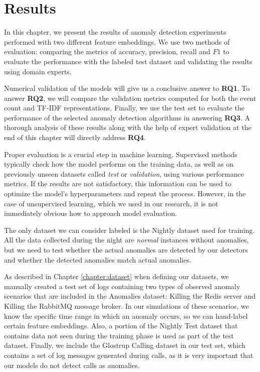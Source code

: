 \chapter{Results}
\label{results}

In this chapter, we present the results of anomaly detection experiments performed with two different feature embeddings. We use two methods of evaluation: comparing the metrics of accuracy, precision, recall and $F1$ to evaluate the performance with the labeled test dataset and validating the results using domain experts.

Numerical validation of the models will give us a conclusive answer to \textbf{RQ1}. To answer \textbf{RQ2}, we will compare the validation metrics computed for both the event count and TF-IDF representations. Finally, we use the test set to evaluate the performance of the selected anomaly detection algorithms in answering \textbf{RQ3}. A thorough analysis of these results along with the help of expert validation at the end of this chapter will directly address \textbf{RQ4}.

Proper evaluation is a crucial step in machine learning. Supervised methods typically check how the model performs on the training data, as well as on previously unseen datasets called \textit{test} or \textit{validation}, using various performance metrics. If the results are not satisfactory, this information can be used to optimize the model's hyperparameters and repeat the process. However, in the case of unsupervised learning, which we used in our research, it is not immediately obvious how to approach model evaluation. 

The only dataset we can consider labeled is the Nightly dataset used for training. All the data collected during the night are \textit{normal} instances without anomalies, but we need to test whether the actual anomalies are detected by our detectors and whether the detected anomalies match actual anomalies. 

As described in Chapter \ref{chapter:dataset} when defining our datasets, we manually created a test set of logs containing two types of observed anomaly scenarios that are included in the Anomalies dataset: Killing the Redis server and Killing the RabbitMQ message broker. In our simulations of these scenarios, we know the specific time range in which an anomaly occurs, so we can hand-label certain feature embeddings. Also, a portion of the Nightly Test dataset that contains data not seen during the training phase is used as part of the test dataset. Finally, we include the Glostrup Calling dataset in our test set, which contains a set of log messages generated during calls, as it is very important that our models do not detect calls as anomalies.

